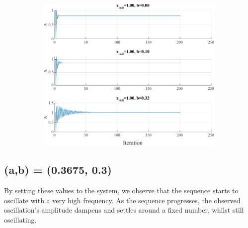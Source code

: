 \begin{figure}[htpb]
\begin{subfigure}{0.47\textwidth}
		\includegraphics[width=\textwidth]{../Problem 3/prob3_(b)_x_init_1.00.pdf}
		\caption{}
	\end{subfigure}
	\caption{}
	\label{fig:prob3_multiple_x_multiple_b}
\end{figure}

\subsection{(a,b) = (0.3675, 0.3)}

By setting these values to the system, we observe that the sequence starts to oscillate with a very high frequency. As the sequence progresses, the observed oscillation's amplitude dampens and settles around a fixed number, whilst still oscillating.

